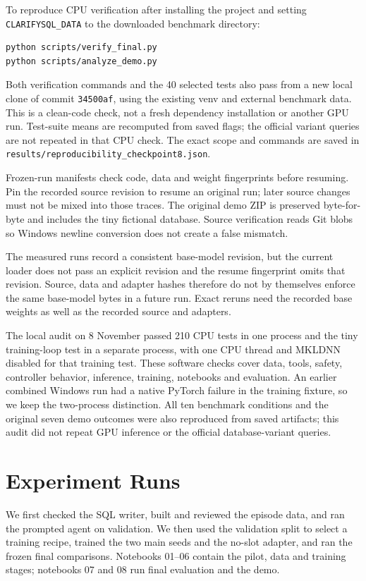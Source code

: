 \documentclass[11pt,a4paper]{article}
\newcommand{\file}[1]{\nolinkurl{#1}}
\begin{document}
To reproduce CPU verification after installing the project and setting \file{CLARIFYSQL_DATA} to the
downloaded benchmark directory:
\begin{verbatim}
python scripts/verify_final.py
python scripts/analyze_demo.py
\end{verbatim}
Both verification commands and the 40 selected tests also pass from a new local clone of commit
\file{34500af}, using the existing venv and external benchmark data. This is a clean-code check, not
a fresh dependency installation or another GPU run. Test-suite means are recomputed from saved flags;
the official variant queries are not repeated in that CPU check. The exact scope and commands are saved
in \file{results/reproducibility_checkpoint8.json}.

Frozen-run manifests check code, data and weight fingerprints before resuming. Pin the recorded source
revision to resume an original run; later source changes must not be mixed into those traces. The original
demo ZIP is preserved byte-for-byte and includes the tiny fictional database. Source verification reads
Git blobs so Windows newline conversion does not create a false mismatch.

The measured runs record a consistent base-model revision, but the current loader does not pass an
explicit revision and the resume fingerprint omits that revision. Source, data and adapter hashes
therefore do not by themselves enforce the same base-model bytes in a future run. Exact reruns need
the recorded base weights as well as the recorded source and adapters.

The local audit on 8 November passed 210 CPU tests in one process and the tiny training-loop test in a separate
process, with one CPU thread and MKLDNN disabled for that training test. These software checks cover
data, tools, safety, controller behavior, inference, training, notebooks and evaluation. An earlier combined
Windows run had a native PyTorch failure in the training fixture, so we keep the two-process distinction.
All ten benchmark conditions and the original seven demo outcomes were also reproduced from saved artifacts;
this audit did not repeat GPU inference or the official database-variant queries.

\section{Experiment Runs}

We first checked the SQL writer, built and reviewed the episode data, and ran the prompted agent
on validation. We then used the validation split to select a training recipe, trained the two main
seeds and the no-slot adapter, and ran the frozen final comparisons. Notebooks 01--06 contain the
pilot, data and training stages; notebooks 07 and 08 run final evaluation and the demo.
\end{document}
